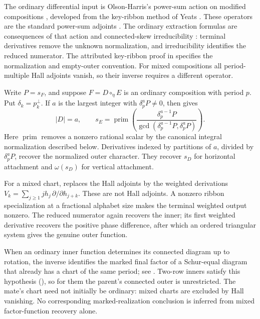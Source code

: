 \documentclass[11pt,a4paper]{amsart}
\numberwithin{equation}{section}
\theoremstyle{plain}
\theoremstyle{definition}
\begin{document}
The ordinary differential input is Olson-Harris's power-sum action on modified compositions \cite[Lem.~5.4.7 and Thms.~5.4.8--5.4.9]{OlsonHarris2024HopfApplications}, developed from the key-ribbon method of Yeats \cite{Yeats2017HopfSchur}.  These operators are the standard power-sum adjoints \cite[Ch.~I, \S5, Ex.~3]{Macdonald1995SymmetricFunctions}.  The ordinary extraction formulas are consequences of that action and connected-skew irreducibility \cite{Barekat2009CoincidencesCorrigendum}: terminal derivatives remove the unknown normalization, and irreducibility identifies the reduced numerator.  The attributed key-ribbon proof in  specifies the normalization and empty-outer convention.  For mixed compositions all period-multiple Hall adjoints vanish, so their inverse requires a different operator.

Write \(P=s_F\), and suppose \(F=D\circ_\eta E\) is an ordinary composition with period \(p\).  Put \(\delta_k=p_k^\perp\).  If \(a\) is the largest integer with \(\delta_p^aP\ne0\), then  gives
\[
 |D|=a,\qquad
 s_E=\operatorname{prim}\!\left(
 \frac{\delta_p^{a-1}P}{\gcd(\delta_p^{a-1}P,\delta_p^aP)}\right).
\]
Here \(\operatorname{prim}\) removes a nonzero rational scalar by the canonical integral normalization described below.  Derivatives indexed by partitions of \(a\), divided by \(\delta_p^aP\), recover the normalized outer character.  They recover \(s_D\) for horizontal attachment and \(\omega(s_D)\) for vertical attachment.

For a mixed chart,  replaces the Hall adjoints by the weighted derivations \(V_k=\sum_{j\ge1}j h_j\,\partial/\partial h_{j+k}\).  These are not Hall adjoints.  A nonzero ribbon specialization at a fractional alphabet size makes the terminal weighted output nonzero.  The reduced numerator again recovers the inner; its first weighted derivative recovers the positive phase difference, after which an ordered triangular system gives the genuine outer function.

When an ordinary inner function determines its connected diagram up to rotation, the inverse identifies the marked final factor of a Schur-equal diagram that already has a chart of the same period; see .  Two-row inners satisfy this hypothesis (), so for them the parent's connected outer is unrestricted.  The mate's chart need not initially be ordinary: mixed charts are excluded by Hall vanishing.  No corresponding marked-realization conclusion is inferred from mixed factor-function recovery alone.
\end{document}
